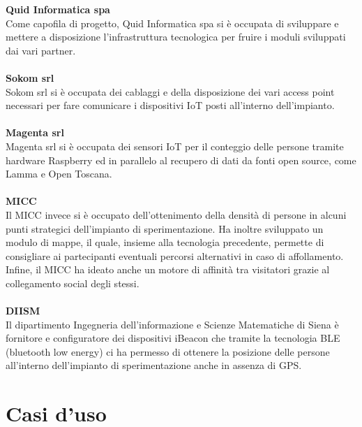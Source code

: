 \textbf{Quid Informatica spa}\\
Come capofila di progetto, Quid Informatica spa si è occupata di sviluppare e mettere a disposizione l’infrastruttura tecnologica per fruire i moduli sviluppati dai vari partner.
\\\\
\textbf{Sokom srl}\\
Sokom srl si è occupata dei cablaggi e della disposizione dei vari access point necessari per fare comunicare i dispositivi IoT posti all’interno dell’impianto.
\\\\
\textbf{Magenta srl}\\
Magenta srl si è occupata dei sensori IoT per il conteggio delle persone tramite hardware Raspberry ed in parallelo al recupero di dati da fonti open source, come Lamma e Open Toscana.
\\\\
\textbf{MICC}\\
Il MICC invece si è occupato dell’ottenimento della densità di persone in alcuni punti strategici dell’impianto di sperimentazione. Ha inoltre sviluppato un modulo di mappe, il quale, insieme alla tecnologia precedente, permette di consigliare ai partecipanti eventuali percorsi alternativi in caso di affollamento.
Infine, il MICC ha ideato anche un motore di affinità tra visitatori grazie al collegamento social degli stessi.
\\\\
\textbf{DIISM}\\
Il dipartimento Ingegneria dell’informazione e Scienze Matematiche di Siena è fornitore e configuratore dei dispositivi iBeacon che tramite la tecnologia BLE (bluetooth low energy) ci ha permesso di ottenere la posizione delle persone all’interno dell’impianto di sperimentazione anche in assenza di GPS.
\paragraph{}

\section{Casi d'uso}

